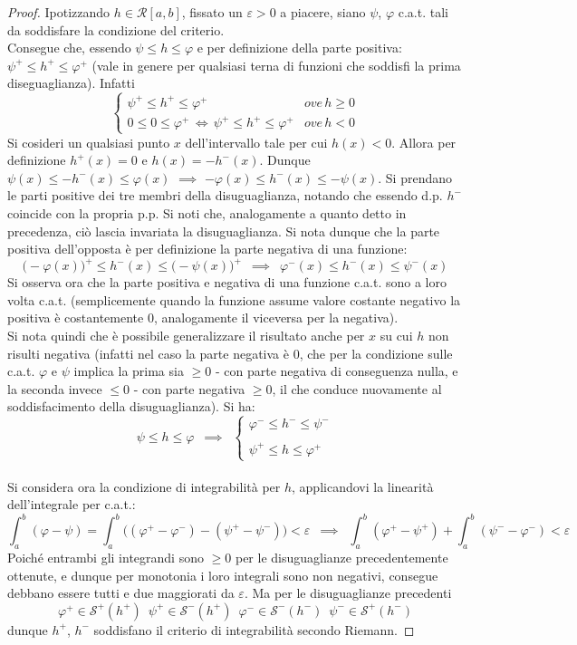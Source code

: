 \documentclass[10pt, oneside]{book}
\theoremstyle{plain}
\begin{document}
\begin{proof}
Ipotizzando $h \in \mathcal{R}[a,b]$, fissato un $\varepsilon > 0$ a piacere, siano $\psi$, $\varphi$ c.a.t. tali da soddisfare la condizione del criterio. \\
Consegue che, essendo $\psi \leq h \leq \varphi$ e per definizione della parte positiva: $\psi^+ \leq h^+ \leq \varphi^+$ (vale in genere per qualsiasi terna di funzioni che soddisfi la prima diseguaglianza). Infatti
\[\begin{cases}
\displaystyle \psi^+ \leq h^+ \leq \varphi^+ & ove \, h \geq 0\\
\displaystyle 0 \leq 0 \leq \varphi^+ \, \Leftrightarrow \, \psi^+ \leq h^+ \leq \varphi^+ & ove \, h < 0
\end{cases}\]
Si cosideri un qualsiasi punto $x$ dell'intervallo tale per cui $h(x) < 0$. Allora per definizione $h^+(x) = 0$ e $h(x) = - h^-(x)$. Dunque $\psi(x) \leq - h^-(x) \leq \varphi(x)$ $\implies$ $ - \varphi(x) \leq h^-(x) \leq - \psi(x)$. Si prendano le parti positive dei tre membri della disuguaglianza, notando che essendo d.p. $h^-$ coincide con la propria p.p. Si noti che, analogamente a quanto detto in precedenza, ciò lascia invariata la disuguaglianza. Si nota dunque che la parte positiva dell'opposta è per definizione la parte negativa di una funzione:
\[\big(-\varphi(x)\big)^+ \leq h^-(x) \leq \big(-\psi(x)\big)^+ \enspace \implies \enspace \varphi^-(x) \leq h^-(x) \leq \psi^-(x)\]
Si osserva ora che la parte positiva e negativa di una funzione c.a.t. sono a loro volta c.a.t. (semplicemente quando la funzione assume valore costante negativo la positiva è costantemente 0, analogamente il viceversa per la negativa). 
\\Si nota quindi che è possibile generalizzare il risultato anche per $x$ su cui $h$ non risulti negativa (infatti nel caso la parte negativa è $0$, che per la condizione sulle c.a.t. $\varphi$ e $\psi$ implica la prima sia $\geq 0$ - con parte negativa di conseguenza nulla, e la seconda invece $\leq 0$ - con parte negativa $\geq 0$, il che conduce nuovamente al soddisfacimento della disuguaglianza). Si ha:
\[\psi \leq h \leq \varphi \enspace \implies \enspace \begin{cases}
    \varphi^- \leq h^- \leq \psi^-\\
    \\
    \psi^+ \leq h \leq \varphi^+
\end{cases}\]
\\Si considera ora la condizione di integrabilità per $h$, applicandovi la linearità dell'integrale per c.a.t.:
\[\int_a^b (\varphi - \psi) = \int_a^b \big((\varphi^+ - \varphi^-) - (\psi^+ - \psi^-)\big) < \varepsilon \enspace \implies \enspace \int_a^b (\varphi^+ - \psi^+) + \int_a^b (\psi^- - \varphi^-) < \varepsilon\]
Poiché entrambi gli integrandi sono $\geq 0$ per le disuguaglianze precedentemente ottenute, e dunque per monotonia i loro integrali sono non negativi, consegue debbano essere tutti e due maggiorati da $\varepsilon$. Ma per le disuguaglianze precedenti
\[\varphi^+ \in  \mathcal{S}^+(h^+) \enspace \psi^+ \in  \mathcal{S}^-(h^+) \enspace \varphi^- \in  \mathcal{S}^-(h^-) \enspace \psi^- \in  \mathcal{S}^+(h^-)\]
dunque $h^+$, $h^-$ soddisfano il criterio di integrabilità secondo Riemann.
\end{proof}
\end{document}
